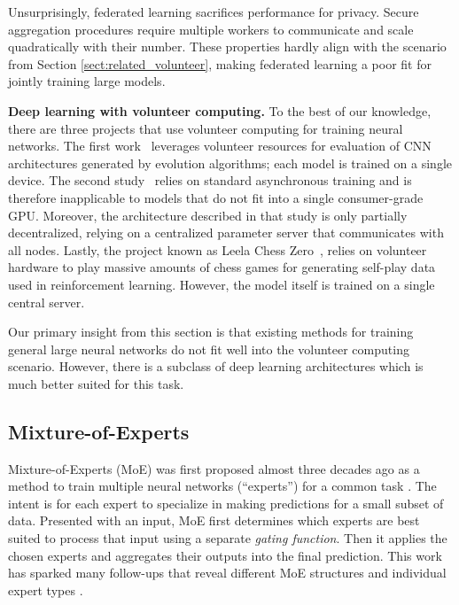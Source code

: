 \vspace{-1px}

Unsurprisingly, federated learning sacrifices performance for privacy. Secure aggregation procedures \cite{bonawitz2017practical} require multiple workers to communicate and scale quadratically with their number. These properties hardly align with the scenario from Section \ref{sect:related_volunteer}, making federated learning a poor fit for jointly training large models.

\textbf{Deep learning with volunteer computing.} To the best of our knowledge, there are three projects that use volunteer computing for training neural networks. The first work~\cite{desell2017} leverages volunteer resources for evaluation of CNN architectures generated by evolution algorithms; each model is trained on a single device.
The second study~\cite{volunteer_dl_async} relies on standard asynchronous training and is therefore inapplicable to models that do not fit into a single consumer-grade GPU. Moreover, the architecture described in that study is only partially decentralized, relying on a centralized parameter server that communicates with all nodes. Lastly, the project known as Leela Chess Zero~\cite{lc0}, relies on volunteer hardware to play massive amounts of chess games for generating self-play data used in reinforcement learning. However, the model itself is trained on a single central server.

Our primary insight from this section is that existing methods for training general large neural networks do not fit well into the volunteer computing scenario. However, there is a subclass of deep learning architectures which is much better suited for this task.

\vspace{-2px}
\subsection{Mixture-of-Experts}\label{sect:related_moe}
\vspace{-2px}

Mixture-of-Experts (MoE) was first proposed almost three decades ago as a method to train multiple neural networks (``experts'') for a common task \cite{moe_first}. The intent is for each expert to specialize in making predictions for a small subset of data. Presented with an input, MoE first determines which experts are best suited to process that input using a separate \textit{gating function}. Then it applies the chosen experts and aggregates their outputs into the final prediction. This work has sparked many follow-ups that reveal different MoE structures \cite{jordan1994hierarchical, yao2009hierarchical,moe_lifelong,rasmussen2002infinite} and individual expert types \cite{moe_svm,moe_dirichlet}.

